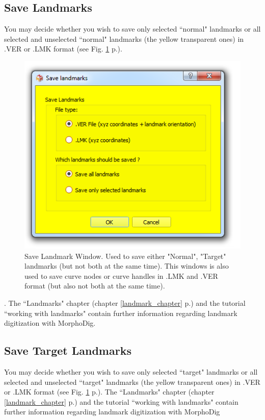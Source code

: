 \subsection{Save Landmarks}
You may decide whether you wish to save only selected ``normal" landmarks or all selected and
unselected ``normal" landmarks (the yellow transparent ones) in .VER or .LMK format (see Fig. \ref{save_ver_lmk} p.\pageref{save_ver_lmk}).
\begin{figure}
  \centering
  \includegraphics[scale=0.5]{images/07/landmarks/save_ver_lmk.png}
 \caption{Save Landmark Window. Used to save either "Normal", "Target" landmarks (but not both at the same time). This windows is also used to save curve nodes or curve handles in .LMK and .VER format (but also not both at the same time). }
\label{save_ver_lmk}
\end{figure}.
The ``Landmarks" chapter (chapter \ref{landmark_chapter} p.\pageref{landmark_chapter}) and the tutorial ``working with landmarks" contain further information regarding landmark digitization with MorphoDig.


\subsection{Save Target Landmarks}
You may decide whether you wish to save only selected ``target" landmarks or all selected and
unselected ``target" landmarks (the yellow transparent ones) in .VER or .LMK format (see Fig. \ref{save_ver_lmk} p.\pageref{save_ver_lmk}).
The ``Landmarks" chapter (chapter \ref{landmark_chapter} p.\pageref{landmark_chapter}) and the tutorial ``working with landmarks" contain further information regarding landmark digitization with MorphoDig


